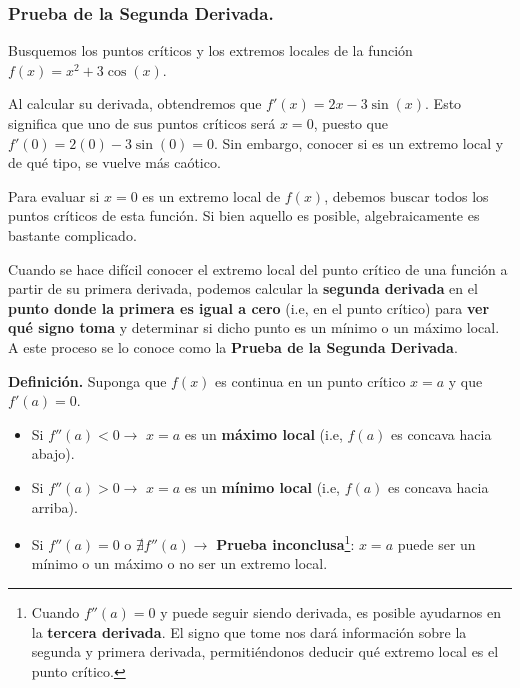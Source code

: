 \documentclass[12pt]{article}
\begin{document}
\subsubsection{Prueba de la Segunda Derivada.}

Busquemos los puntos críticos y los extremos locales de la función $f(x) = x^{2} + 3\cos(x)$.

Al calcular su derivada, obtendremos que $f'(x) = 2x - 3\sin(x)$. Esto significa que uno de sus puntos críticos será $x = 0$, puesto que $f'(0) = 2(0) - 3\sin(0) = 0$. Sin embargo, conocer si es un extremo local y de qué tipo, se vuelve más caótico.

Para evaluar si $x = 0$ es un extremo local de $f(x)$, debemos buscar todos los puntos críticos de esta función. Si bien aquello es posible, algebraicamente es bastante complicado.

Cuando se hace difícil conocer el extremo local del punto crítico de una función a partir de su primera derivada, podemos calcular la \textbf{segunda derivada} en el \textbf{punto donde la primera es igual a cero} (i.e, en el punto crítico) para \textbf{ver qué signo toma} y determinar si dicho punto es un mínimo o un máximo local. A este proceso se lo conoce como la \textbf{Prueba de la Segunda Derivada}.


\textbf{Definición.} \quad Suponga que $f(x)$ es continua en un punto crítico $x = a$ y que $f'(a) = 0$.

\begin{itemize}
\item Si $f''(a) < 0 \rightarrow$ $x = a$ es un \textbf{máximo local} (i.e, $f(a)$ es concava hacia abajo).

\item Si $f''(a) > 0 \rightarrow$ $x = a$ es un \textbf{mínimo local} (i.e, $f(a)$ es concava hacia arriba).

\item Si $f''(a) = 0$ o $\nexists f''(a) \rightarrow$ \textbf{Prueba inconclusa}\footnote{Cuando $f''(a) = 0$ y puede seguir siendo derivada, es posible ayudarnos en la \textbf{tercera derivada}. El signo que tome nos dará información sobre la segunda y primera derivada, permitiéndonos deducir qué extremo local es el punto crítico.}: $x = a$ puede ser un mínimo o un máximo o no ser un extremo local.
\end{itemize}
\end{document}
